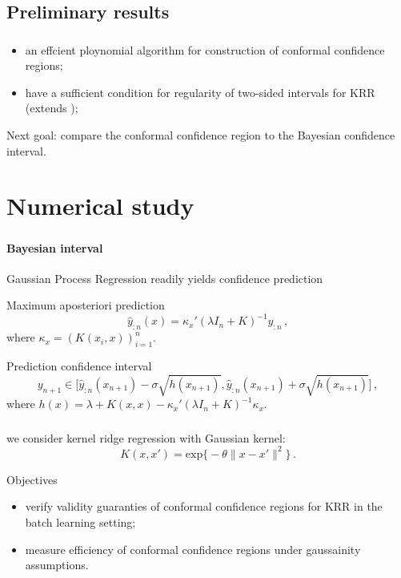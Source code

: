 \documentclass[t]{beamer}  %
\begin{document}

\subsection{Preliminary results} %
\label{sub:preliminary_results}

\begin{frame}[c]\frametitle{\insertsection}
  \framesubtitle{\insertsubsection}
  \begin{itemize}
    \item an effcient ploynomial algorithm for construction of conformal
    confidence regions;
    \item have a sufficient condition for regularity of two-sided intervals
    for KRR (extends \cite{burnaevV14});
  \end{itemize}

  Next goal: compare the conformal confidence region to the Bayesian confidence
  interval.
\end{frame}



\section{Numerical study} %
\label{sec:Numerical_study}

\begin{frame}[c]\frametitle{\insertsection}
  \framesubtitle{Bayesian interval}
  Gaussian Process Regression readily yields confidence prediction
  \begin{block}{Maximum aposteriori prediction}
    $$ \hat{y}_{:n}(x) = \kappa_x' (\lambda I_n + K)^{-1} y_{:n} \,, $$
    where $\kappa_x = (K(x_i, x))_{i=1}^n$.
  \end{block}

  \begin{block}{Prediction confidence interval}
    $$ y_{n+1} \in
      \bigl[\hat{y}_{:n}(x_{n+1}) - \sigma \sqrt{h(x_{n+1})},
            \hat{y}_{:n}(x_{n+1}) + \sigma \sqrt{h(x_{n+1})} \bigr] \,, $$
    where $ h(x) = \lambda + K(x,x) - \kappa_x' (\lambda I_n + K)^{-1} \kappa_x$.
  \end{block}
\end{frame}

\begin{frame}[c]\frametitle{\insertsection}
  we consider kernel ridge regression with Gaussian kernel:
  $$ K(x,x') = \text{exp}\bigl\{ -\theta \|x-x'\|^2 \bigr\} \,. $$
  \begin{block}{Objectives}
    \begin{itemize}
      \item verify validity guaranties of conformal confidence regions for KRR in
      the batch learning setting;
      \item measure efficiency of conformal confidence regions under gaussainity
      assumptions.
    \end{itemize}
  \end{block}
\end{frame}
\end{document}
